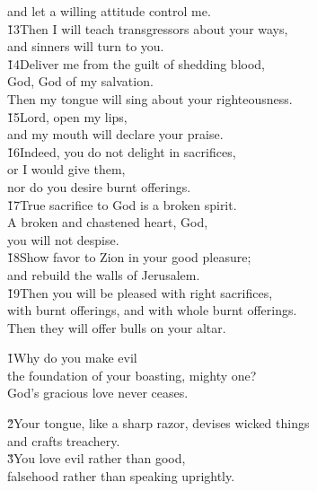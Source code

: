 \begin{poetry}
\poemll    and let a willing attitude control me. \\
\poeml \v{13}Then I will teach transgressors about your ways, \\
\poemll    and sinners will turn to you. \\
\poeml \v{14}Deliver me from the guilt of shedding blood, \\
\poemll    God, God of my salvation. \\
\poemlll       Then my tongue will sing about your righteousness. \\
\poeml \v{15}Lord, open my lips, \\
\poemll    and my mouth will declare your praise. \\
\poeml \v{16}Indeed, you do not delight in sacrifices, \\
\poemll    or I would give them, \\
\poemlll       nor do you desire burnt offerings. \\
\poeml \v{17}True sacrifice to God is a broken spirit. \\
\poemll    A broken and chastened heart, God, \\
\poemlll       you will not despise. \\
\poeml \v{18}Show favor to Zion in your good pleasure; \\
\poemll    and rebuild the walls of Jerusalem. \\
\poeml \v{19}Then you will be pleased with right sacrifices, \\
\poemll    with burnt offerings, and with whole burnt offerings. \\
\poemlll       Then they will offer bulls on your altar.
\end{poetry}

\begin{poetry}
\poeml \v{1}Why do you make evil \\
\poemll    the foundation of your boasting, mighty one? \\
\poemlll       God's gracious love never ceases.
\end{poetry}

\begin{poetry}
\poeml \v{2}Your tongue, like a sharp razor, devises wicked things \\
\poemll    and crafts treachery. \\
\poeml \v{3}You love evil rather than good, \\
\poemll    falsehood rather than speaking uprightly.
\end{poetry}

